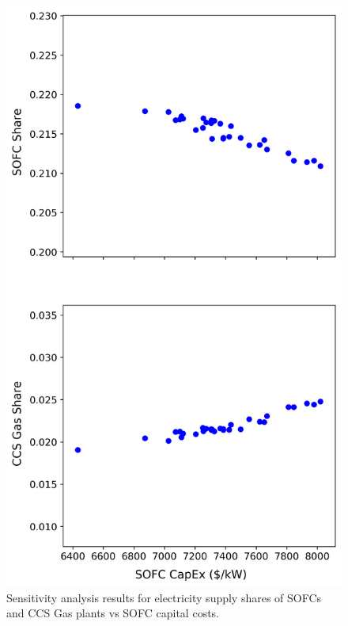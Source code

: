 \begin{figure}[H] 
\centering
\includegraphics[scale=0.7]{figures/satechselc_abbrv}
\caption{Sensitivity analysis results for electricity supply shares of SOFCs and CCS Gas plants vs SOFC capital costs.}
\label{satechs-smol}
\end{figure}

